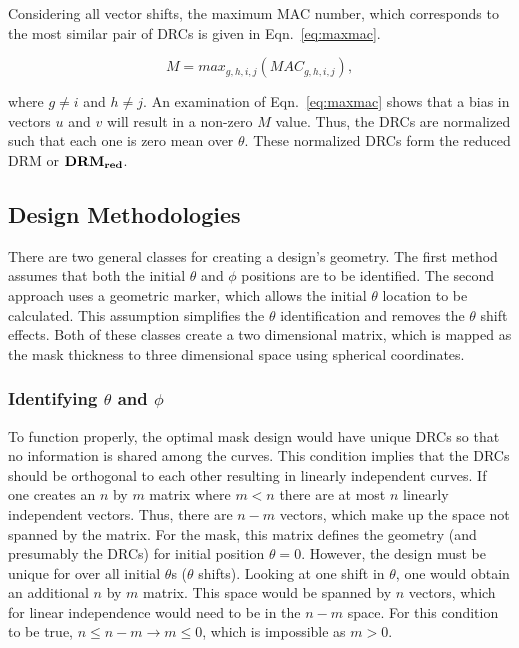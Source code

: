 \documentclass[3p,times]{elsarticle}
\begin{document}
Considering all vector shifts, the maximum MAC number, which corresponds to the most similar pair of DRCs is given in Eqn.~\ref{eq:maxmac}.

\begin{equation}
M=max_{g,h,i,j}\left(MAC_{g,h,i,j}\right),
\label{eq:maxmac}
\end{equation}

\noindent where $g\neq i$ and $h\neq j$.  An examination of Eqn.~\ref{eq:maxmac} shows that a bias in vectors $u$ and $v$ will result in a non-zero $M$ value.  
Thus, the DRCs are normalized such that each one is zero mean over $\theta$.  
These normalized DRCs form the reduced DRM or $\bf{DRM_{red}}$. 

\subsection{Design Methodologies} \label{design-methods}
There are two general classes for creating a design's geometry.  
The first method assumes that both the initial $\theta$ and $\phi$ positions are to be identified.  
The second approach uses a geometric marker, which allows the initial $\theta$ location to be calculated.  
This assumption simplifies the $\theta$ identification and removes the $\theta$ shift effects.  
Both of these classes create a two dimensional matrix, which is mapped as the mask thickness to three dimensional space using spherical coordinates.

\subsubsection{Identifying $\theta$ and $\phi$}
To function properly, the optimal mask design would have unique DRCs so that no information is shared among the curves.  
This condition implies that the DRCs should be orthogonal to each other resulting in linearly independent curves.  
If one creates an $n$ by $m$ matrix where $m<n$ there are at most $n$ linearly independent vectors.  
Thus, there are $n-m$ vectors, which make up the space not spanned by the matrix.  
For the mask, this matrix defines the geometry (and presumably the DRCs) for initial position $\theta=0$.  
However, the design must be unique for over all initial $\theta$s ($\theta$ shifts).  
Looking at one shift in $\theta$, one would obtain an additional $n$ by $m$ matrix.  
This space would be spanned by $n$ vectors, which for linear independence would
need to be in the $n-m$ space.  
For this condition to be true, $n\leq n-m\rightarrow m\leq 0$, which is impossible as $m>0$.
\end{document}

